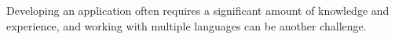 
\chapter{}%
\label{ch:inleiding}



\section{}%
\label{sec:probleemstelling}


Developing an application often requires a significant amount of knowledge and experience, and working with multiple languages can be another challenge. 

